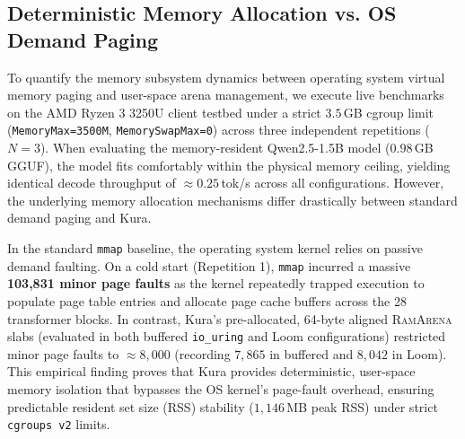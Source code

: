 \subsection{Deterministic Memory Allocation vs. OS Demand Paging}
To quantify the memory subsystem dynamics between operating system virtual memory paging and user-space arena management, we execute live benchmarks on the AMD Ryzen 3 3250U client testbed under a strict $3.5$\,GB cgroup limit (\texttt{MemoryMax=3500M}, \texttt{MemorySwapMax=0}) across three independent repetitions ($N=3$). When evaluating the memory-resident Qwen2.5-1.5B model ($0.98$\,GB GGUF), the model fits comfortably within the physical memory ceiling, yielding identical decode throughput of $\approx 0.25$\,tok/s across all configurations. However, the underlying memory allocation mechanisms differ drastically between standard demand paging and Kura.

In the standard \texttt{mmap} baseline, the operating system kernel relies on passive demand faulting. On a cold start (Repetition 1), \texttt{mmap} incurred a massive \textbf{103,831 minor page faults} as the kernel repeatedly trapped execution to populate page table entries and allocate page cache buffers across the 28 transformer blocks. In contrast, Kura's pre-allocated, 64-byte aligned \textsc{RamArena} slabs (evaluated in both buffered \texttt{io\_uring} and Loom configurations) restricted minor page faults to $\approx 8,000$ (recording $7,865$ in buffered and $8,042$ in Loom). This empirical finding proves that Kura provides deterministic, user-space memory isolation that bypasses the OS kernel's page-fault overhead, ensuring predictable resident set size (RSS) stability ($1,146$\,MB peak RSS) under strict \texttt{cgroups v2} limits.
